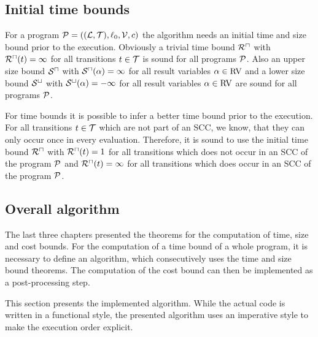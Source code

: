 \subsection{Initial time bounds}

For a program $\mathcal{P} = ((\mathcal{L}, \mathcal{T}), \ell_0, \mathcal{V}, c)$ the algorithm needs an initial time and size bound prior to the execution.
Obviously a trivial time bound ${\mathcal{R}^\sqcap}$ with ${\mathcal{R}^\sqcap}(t) = \infty$ for all transitions $t \in \mathcal{T}$ is sound for all programs $\mathcal{P}$.
Also an upper size bound ${\mathcal{S}^\sqcap}$ with ${\mathcal{S}^\sqcap}(\alpha) = \infty$ for all result variables $\alpha \in \text{RV}$ and a lower size bound ${\mathcal{S}^\sqcup}$ with ${\mathcal{S}^\sqcup}(\alpha) = -\infty$ for all result variables $\alpha \in \text{RV}$ are sound for all programs $\mathcal{P}$.

For time bounds it is possible to infer a better time bound prior to the execution.
For all transitions $t \in \mathcal{T}$ which are not part of an SCC, we know, that they can only occur once in every evaluation.
Therefore, it is sound to use the initial time bound ${\mathcal{R}^\sqcap}$ with ${\mathcal{R}^\sqcap}(t) = 1$ for all transitions which does not occur in an SCC of the program $\mathcal{P}$ and ${\mathcal{R}^\sqcap}(t) = \infty$ for all transitions which does occur in an SCC of the program $\mathcal{P}$.

\subsection{Overall algorithm}

The last three chapters presented the theorems for the computation of time, size and cost bounds.
For the computation of a time bound of a whole program, it is necessary to define an algorithm, which consecutively uses the time and size bound theorems.
The computation of the cost bound can then be implemented as a post-processing step.

This section presents the implemented algorithm.
While the actual code is written in a functional style, the presented algorithm uses an imperative style to make the execution order explicit.

